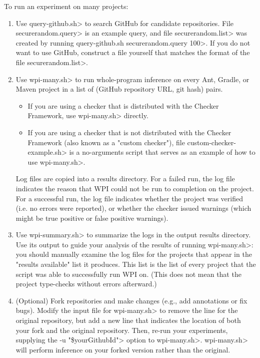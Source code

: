 To run an experiment on many projects:
\begin{enumerate}
\item Use \<query-github.sh> to search GitHub for candidate repositories.
File \<securerandom.query> is an example query, and file
\<securerandom.list>
was created by running \<query-github.sh securerandom.query 100>. If you do
not want to use GitHub, construct a file yourself that matches the format of
the file \<securerandom.list>.

\item Use \<wpi-many.sh> to run whole-program inference on every
Ant, Gradle, or Maven project in a list of (GitHub repository URL, git hash)
pairs.
\begin{itemize}
\item If you are using a checker that is distributed with the Checker
Framework, use \<wpi-many.sh> directly.
\item If you are using a checker that is not distributed with the Checker
Framework (also known as a "custom checker"), file
\<custom-checker-example.sh> is a no-arguments
script that serves as an example of how to use \<wpi-many.sh>.
\end{itemize}

Log files are copied into a results directory.
For a failed run, the log file indicates the reason that WPI could not
be run to completion on the project.
For a successful run, the log file indicates whether the project was verified
(i.e. no errors were reported), or whether the checker issued warnings
(which might be true positive or false positive warnings).

\item Use \<wpi-summary.sh> to summarize the logs in the output results directory.
Use its output to guide your analysis of the results of running \<wpi-many.sh>:
you should manually examine the log files for the projects that appear in the
"results available" list it produces. This list is the list of every project
that the script was able to successfully run WPI on.  (This does not mean
that the project type-checks without errors afterward.)

\item (Optional) Fork repositories and make changes (e.g., add annotations or fix bugs).
Modify the input file for \<wpi-many.sh> to remove the line for the original repository,
but add a new line that indicates the location of both your
fork and the original repository.
Then, re-run your experiments, supplying the \<-u "\$yourGithubId"> option to \<wpi-many.sh>.
\<wpi-many.sh> will perform inference on your forked version rather than
the original.

\end{enumerate}

